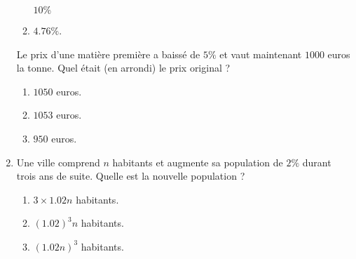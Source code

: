 \begin{exercice}
\begin{enumerate}
\begin{enumerate}
                \( 10\%\)
            \item
                \( 4.76\%\).
        \end{enumerate}
        Le prix d'une matière première a baissé de \( 5\%\) et vaut maintenant \( 1000\) euros la tonne. Quel était (en arrondi) le prix original ?
        \begin{enumerate}
            \item
                \( 1050\) euros.
            \item
                \( 1053\) euros.
            \item
                \( 950\) euros.
        \end{enumerate}
    \item
        Une ville comprend \( n\) habitants et augmente sa population de \( 2\%\) durant trois ans de suite. Quelle est la nouvelle population ?
        \begin{enumerate}
            \item
                \( 3\times 1.02n\) habitants.
            \item
                \( (1.02)^3n\) habitants.
            \item
                \( (1.02n)^3\) habitants.
        \end{enumerate}

    \end{enumerate}

        
\end{exercice}
